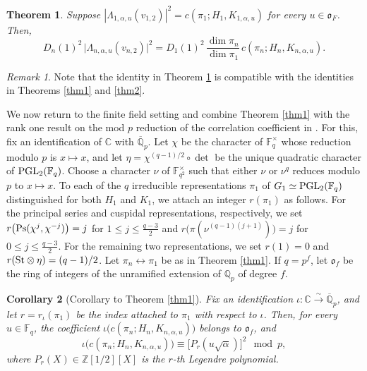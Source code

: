 \documentclass[12pt]{amsart}
\newtheorem{theorem}{Theorem}[section] %
\newtheorem{corollary}[theorem]{Corollary}%
\theoremstyle{definition}
\theoremstyle{remark}
\newtheorem{remark}{Remark}
\begin{document}
\begin{theorem}\label{thm3}
Suppose $|\Lambda_{1,\alpha,u}(v_{1,2})|^2 = c(\pi_1;H_1,K_{1,\alpha,u})$ for every $u \in \mathfrak o_F$.
Then,
\[
D_n(1)^2\,\bigl|\Lambda_{n,\alpha,u}(v_{n,2})\bigr|^2
=
D_1(1)^2\,
\frac{\dim\pi_n}{\dim\pi_1}\,
c(\pi_n;H_n,K_{n,\alpha,u}).
\]
\end{theorem}

\begin{remark}
Note that the identity in Theorem \ref{thm3} is compatible with the identities in Theorems \ref{thm1} and \ref{thm2}.
\end{remark}

We now return to the finite field setting and combine Theorem \ref{thm1} with the rank one result on the mod $p$ reduction of the correlation coefficient in \cite{ana25}. For this, fix an identification of $\mathbb C$ with $\overline{\mathbb Q}_p$. Let $\chi$ be the character of $\mathbb F_q^\times$ whose reduction modulo $p$ is $x\mapsto x$, and let $\eta=\chi^{(q-1)/2}\circ\det$ be the unique quadratic character of ${\rm PGL}_2(\mathbb F_q)$. Choose a character $\nu$ of $\mathbb F_{q^2}^\times$ such that either $\nu$ or $\nu^q$ reduces modulo $p$ to $x\mapsto x$.
To each of the $q$ irreducible representations $\pi_1$ of $G_1\simeq {\rm PGL}_2(\mathbb F_q)$ distinguished for both $H_1$ and $K_1$, we attach an integer $r(\pi_1)$ as follows. For the principal series and cuspidal representations, respectively, we set
$r\bigl({\rm Ps}(\chi^j,\chi^{-j})\bigr)
 =j$ for $1\le j\le \frac{q-3}{2}$ and $r\bigl(\pi(\nu^{(q-1)(j+1)})\bigr)
  =j$ for $0\le j\le \frac{q-3}{2}$. For the remaining two representations, we set
$r(1)=0$ and $r({\rm St}\otimes\eta)=(q-1)/2$. Let $\pi_n\leftrightarrow\pi_1$ be as in Theorem \ref{thm1}. If $q=p^f$, let $\mathfrak o_f$ be the ring of integers of the unramified extension of $\mathbb Q_p$ of degree $f$.  

\begin{corollary}[Corollary to Theorem \ref{thm1}]\label{coro-thm1}
Fix an identification $\iota\colon\mathbb C\xrightarrow{\sim}\overline{\mathbb Q}_p$, and let $r=r_\iota(\pi_1)$ be the index attached to $\pi_1$ with respect to $\iota$. Then, for every $u\in\mathbb F_q$, the coefficient $\iota\bigl(c(\pi_n;H_n,K_{n,\alpha,u})\bigr)$ belongs to $\mathfrak o_f$, and
\[
\iota\bigl(c(\pi_n;H_n,K_{n,\alpha,u})\bigr)
\equiv \bigl[P_r(u\sqrt{\alpha})\bigr]^2\mod p,
\]
where $P_r(X)\in\mathbb Z[1/2][X]$ is the $r$-th Legendre polynomial.
\end{corollary}
\end{document}
